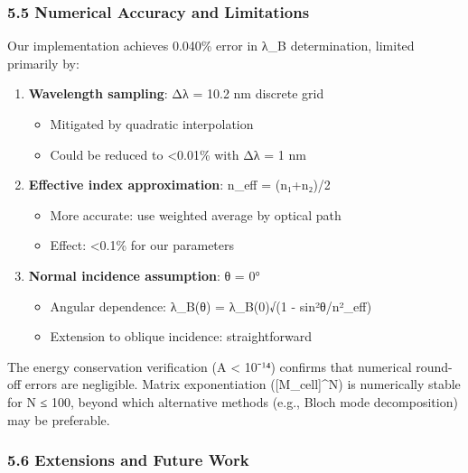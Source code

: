 \documentclass[
]{article}
\providecommand{\tightlist}{%
  \setlength{\itemsep}{0pt}\setlength{\parskip}{0pt}}
\begin{document}
\subsubsection{5.5 Numerical Accuracy and
Limitations}\label{numerical-accuracy-and-limitations}

Our implementation achieves 0.040\% error in λ\_B determination, limited
primarily by:

\begin{enumerate}
\def\labelenumi{\arabic{enumi}.}
\tightlist
\item
  \textbf{Wavelength sampling}: Δλ = 10.2 nm discrete grid

  \begin{itemize}
  \tightlist
  \item
    Mitigated by quadratic interpolation
  \item
    Could be reduced to \textless0.01\% with Δλ = 1 nm
  \end{itemize}
\item
  \textbf{Effective index approximation}: n\_eff = (n₁+n₂)/2

  \begin{itemize}
  \tightlist
  \item
    More accurate: use weighted average by optical path
  \item
    Effect: \textless0.1\% for our parameters
  \end{itemize}
\item
  \textbf{Normal incidence assumption}: θ = 0°

  \begin{itemize}
  \tightlist
  \item
    Angular dependence: λ\_B(θ) = λ\_B(0)√(1 - sin²θ/n²\_eff)
  \item
    Extension to oblique incidence: straightforward
  \end{itemize}
\end{enumerate}

The energy conservation verification (\textbar A\textbar{} \textless{}
10⁻¹⁴) confirms that numerical round-off errors are negligible. Matrix
exponentiation ({[}M\_cell{]}\^{}N) is numerically stable for N ≤ 100,
beyond which alternative methods (e.g., Bloch mode decomposition) may be
preferable.

\subsubsection{5.6 Extensions and Future
Work}\label{extensions-and-future-work}
\end{document}
